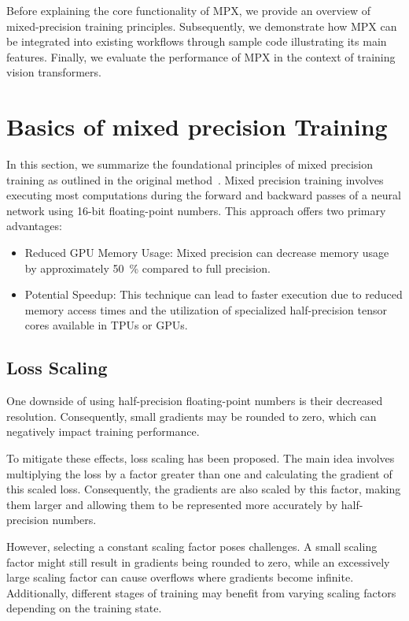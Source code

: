 \documentclass[10pt, a4paper, logo, onecolumn, internal, copyright]{dsme}
\newcommand{\mpx}{\textsc{MPX}}
\begin{document}
Before explaining the core functionality of \mpx{}, we provide an overview of mixed-precision training principles. 
Subsequently, we demonstrate how \mpx{} can be integrated into existing workflows through sample code illustrating its main features.
Finally, we evaluate the performance of \mpx{} in the context of training vision transformers.

\section{Basics of mixed precision Training}
In this section, we summarize the foundational principles of mixed precision training as outlined in the original method~\citep{mixed_precision_paper}. 
Mixed precision training involves executing most computations during the forward and backward passes of a neural network using 16-bit floating-point numbers. 
This approach offers two primary advantages: 
\begin{itemize} 
    \item Reduced GPU Memory Usage: Mixed precision can decrease memory usage by approximately \SI{50}{\percent} compared to full precision. 
    \item Potential Speedup: This technique can lead to faster execution due to reduced memory access times and the utilization of specialized half-precision tensor cores available in TPUs or GPUs. 
\end{itemize}

\subsection{Loss Scaling}
One downside of using half-precision floating-point numbers is their decreased resolution. 
Consequently, small gradients may be rounded to zero, which can negatively impact training performance.

To mitigate these effects, loss scaling has been proposed. 
The main idea involves multiplying the loss by a factor greater than one and calculating the gradient of this scaled loss. 
Consequently, the gradients are also scaled by this factor, making them larger and allowing them to be represented more accurately by half-precision numbers.

However, selecting a constant scaling factor poses challenges. 
A small scaling factor might still result in gradients being rounded to zero, while an excessively large scaling factor can cause overflows where gradients become infinite. 
Additionally, different stages of training may benefit from varying scaling factors depending on the training state.
\end{document}
